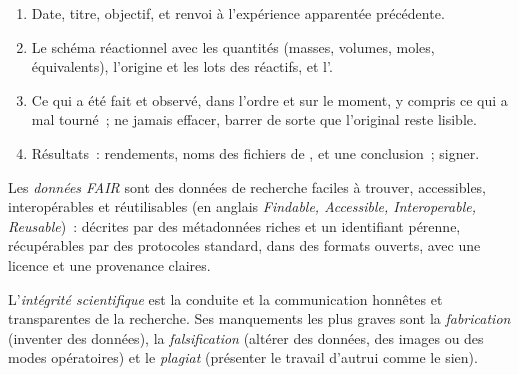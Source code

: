 \begin{method}\label{met:b3:lab-techniques-3:notebook}
\begin{enumerate}
  \item Date, titre, objectif, et renvoi à l'expérience apparentée
        précédente.
  \item Le schéma réactionnel avec les quantités (masses, volumes, moles,
        équivalents), l'origine et les lots des réactifs, et l'.
  \item Ce qui a été fait et observé, dans l'ordre et sur le moment, y
        compris ce qui a mal tourné~; ne jamais effacer, barrer de sorte que
        l'original reste lisible.
  \item Résultats~: rendements, noms des fichiers de , et une
        conclusion~; signer.
\end{enumerate}
\end{method}

\begin{definition}\label{def:b3:lab-techniques-3:fair}
Les \emph{données FAIR} sont des données de recherche faciles
à trouver, accessibles, interopérables et réutilisables (en anglais
\textit{Findable, Accessible, Interoperable, Reusable})~: décrites par des
métadonnées riches et un identifiant pérenne, récupérables par des
protocoles standard, dans des formats ouverts, avec une licence et une
provenance claires.
\end{definition}

\begin{definition}\label{def:b3:lab-techniques-3:integrity}
L'\emph{intégrité scientifique} est la conduite et la
communication honnêtes et transparentes de la recherche. Ses manquements
les plus graves sont la \emph{fabrication} (inventer des données), la \emph{falsification}
(altérer des données, des images ou des modes opératoires) et le \emph{plagiat}
(présenter le travail d'autrui comme le sien).
\end{definition}

